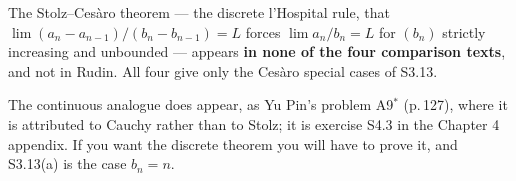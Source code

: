\begin{pitfall}
The Stolz--Ces\`aro theorem --- the discrete l'Hospital rule, that
$\lim (a_n - a_{n-1})/(b_n - b_{n-1}) = L$ forces $\lim a_n/b_n = L$ for
$(b_n)$ strictly increasing and unbounded --- appears \textbf{in none of the
four comparison texts}, and not in Rudin. All four give only the Ces\`aro
special cases of S3.13.

The continuous analogue does appear, as Yu Pin's problem A9$^*$ (p.\,127),
where it is attributed to Cauchy rather than to Stolz; it is exercise S4.3 in
the Chapter 4 appendix. If you want the discrete theorem you will have to
prove it, and S3.13(a) is the case $b_n = n$.
\end{pitfall}
